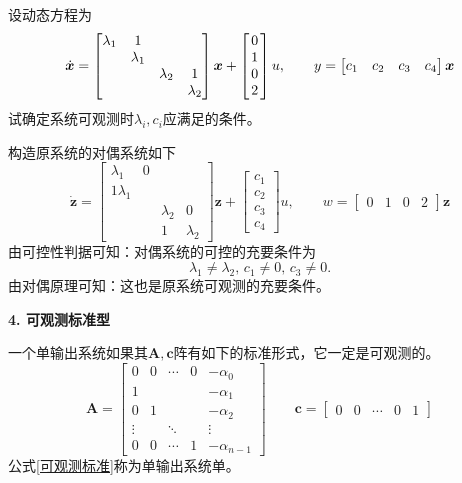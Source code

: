 \examples 设动态方程为
\begin{equation*}
	\dot{\bm{x}} = 
	\begin{bmatrix}
		\lambda_1 & 1 & & \\
		& \lambda_1 & & \\
		& & \lambda_2 & 1\\
		&&& \lambda_2 
	\end{bmatrix}
	\bm{x}
	+ 
	\begin{bmatrix}
		0\\
		\hspace*{0.5mm} 1 \hspace*{0.5mm}\\
		0\\
		2
	\end{bmatrix}
	u,
	\qquad y = 
	\begin{bmatrix}
		c_1 & c_2 & c_3 & c_4
	\end{bmatrix}
	\bm{x}
\end{equation*}
试确定系统可观测时$\lambda_i,c_i$应满足的条件。

\solve 构造原系统的对偶系统如下
\begin{equation*}
	\dot{\bm{z}} = 
	\begin{bmatrix}
		\lambda_1 & 0 &&\\
		1 \lambda_1 & &\\
		&& \lambda_2 & 0\\
		&& 1 &\lambda_2
	\end{bmatrix}
	\bm{z}
	+
	\begin{bmatrix}
		c_1 \\
		c_2 \\
		c_3 \\
		c_4
	\end{bmatrix}
	u,
	\qquad w = 
	\begin{bmatrix}
		0 & 1 & 0 & 2
	\end{bmatrix}
	\bm{z}
\end{equation*}
由可控性判据可知：对偶系统的可控的充要条件为
\begin{equation*}
	\lambda_1 \neq \lambda_2 ,\, c_1 \neq 0,\, c_3 \neq 0.
\end{equation*}
由对偶原理可知：这也是原系统可观测的充要条件。
\clearpage

\noindent \textbf{4. 可观测标准型}

一个单输出系统如果其$\bm{A,c}$阵有如下的标准形式，它一定是可观测的。
\begin{equation}
	\bm{A} = 
	\begin{bmatrix}
		0 & 0 & \cdots & 0 &  -\alpha_0\\
		1 &&&&-\alpha_1 \\
		0 & 1 & & & - \alpha_2\\
		\vdots &  & \ddots & & \vdots\\
		0 & 0 & \cdots & 1 & -\alpha_{n-1}
	\end{bmatrix}
	\qquad 
	\bm{c} = 
	\begin{bmatrix}
		0 & 0& \cdots & 0 &1
	\end{bmatrix}
	\label{可观测标准}
\end{equation}
公式\eqref{可观测标准}称为单输出系统单。
\vspace*{0.5em}

